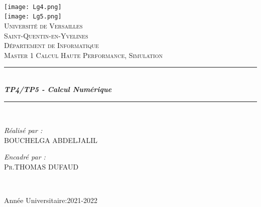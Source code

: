 \documentclass[12pt]{report}
\author{\ }
\title{\ }
\begin{document}
  
  \begin{titlepage}
   \begin{sffamily}
    \begin{center}
     
     
     \texttt{[image: Lg4.png]}~\\
     \texttt{[image: Lg5.png]}~\\[1.9cm]
     
     \textsc{\LARGE Université de Versailles}\\[0.1cm]
     \textsc{\LARGE Saint-Quentin-en-Yvelines}\\ 
     \textsc{Département de Informatique}\\[1.8cm]
     
    \textsc{\Large Master 1 Calcul Haute Performance, Simulation}\\[1.9cm]
    

     
     \rule{0.75\textwidth}{2pt}\\[0.1cm]
     \emph{\textbf{\large TP4/TP5 - Calcul Numérique}}\\ 
     \rule{0.75\textwidth}{2pt}\\[1.3cm]
     

     \begin{minipage}{0.4\textwidth}
      \begin{flushleft} \large
       \textit{\Large Réalisé par :} \\
       \textsc{\normalsize BOUCHELGA ABDELJALIL}\\
      
       
      \end{flushleft}
     \end{minipage}
     \begin{minipage}{0.4\textwidth}
      \begin{flushright} \large
       \textit{\Large Encadré par :}\\
       \textsc{\normalsize Pr.THOMAS DUFAUD}\\
       
      \end{flushright}
     \end{minipage}\\[1cm]
     
   
     
     \vfill
     

     {\large Année Universitaire:2021-2022}
     
    \end{center}
   \end{sffamily}
  \end{titlepage}
  
\end{document}
